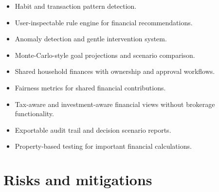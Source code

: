 \documentclass[11pt,a4paper]{article}
\begin{document}
\begin{itemize}[leftmargin=0.7cm]
    \item Habit and transaction pattern detection.
    
    \item User-inspectable rule engine for financial recommendations.
    
    \item Anomaly detection and gentle intervention system.
    
    \item Monte-Carlo-style goal projections and scenario comparison.
    
    \item Shared household finances with ownership and approval workflows.
    
    \item Fairness metrics for shared financial contributions.
    
    \item Tax-aware and investment-aware financial views without brokerage
    functionality.
    
    \item Exportable audit trail and decision scenario reports.
    
    \item Property-based testing for important financial calculations.
\end{itemize}


\section{Risks and mitigations}
\end{document}
